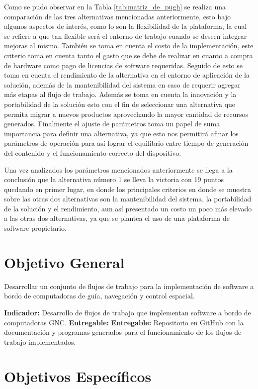 \documentclass[12pt]{article}
\begin{document}
Como se pudo observar en la Tabla \ref{tab:matriz_de_pugh} se realiza una comparación de las tres alternativas mencionadas anteriormente, esto bajo algunos aspectos de interés, como lo son la flexibilidad de la plataforma, la cual se refiere a que tan flexible será el entorno de trabajo cuando se deseen integrar mejoras al mismo. También se toma en cuenta el costo de la implementación, este criterio toma en cuenta tanto el gasto que se debe de realizar en cuanto a compra de hardware como pago de licencias de software requeridas. Seguido de esto se toma en cuenta el rendimiento de la alternativa en el entorno de aplicación de la solución, además de la mantenibilidad del sistema en caso de requerir agregar más etapas al flujo de trabajo. Además se toma en cuenta la innovación y la portabilidad de la solución esto con el fin de seleccionar una alternativa que permita migrar a nuevos productos aprovechando la mayor cantidad de recursos generados. Finalmente el ajuste de parámetros toma un papel de suma importancia para definir una alternativa, ya que esto nos permitirá afinar los parámetros de operación para así lograr el equilibrio entre tiempo de generación del contenido y el funcionamiento correcto del dispositivo.


Una vez analizados los parámetros mencionados anteriormente se llega a la conclusión que la alternativa número 1 se lleva la victoria con 19 puntos quedando en primer lugar, en donde los principales criterios en donde se muestra sobre las otras dos alternativas son la mantenibilidad del sistema, la portabilidad de la solución y el rendimiento, aun así presentado un costo un poco más elevado a las otras dos alternativas, ya que se plantea el uso de una plataforma de software propietario.
  

\section{Objetivo General}

Desarrollar un conjunto de flujos de trabajo para la implementación de software a bordo de computadoras de guía, navegación y control espacial.

\textbf{Indicador:} Desarrollo de flujos de trabajo que implementan software a bordo de computadoras GNC.\newline
\textbf{Entregable:} \textbf{Entregable:} Repositorio en GitHub con la documentación y programas generados para el funcionamiento de los flujos de trabajo implementados.

\section{Objetivos Específicos}
\end{document}
